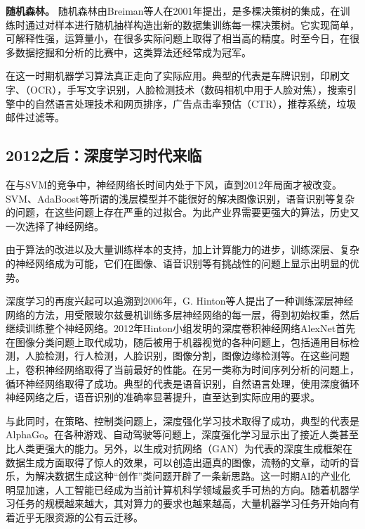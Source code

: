 \textbf{随机森林。}
随机森林由Breiman等人在2001年提出，是多棵决策树的集成，在训练时通过对样本进行随机抽样构造出新的数据集训练每一棵决策树。它实现简单，可解释性强，运算量小，在很多实际问题上取得了相当高的精度。时至今日，在很多数据挖掘和分析的比赛中，这类算法还经常成为冠军。

在这一时期机器学习算法真正走向了实际应用。典型的代表是车牌识别，印刷文字、（OCR），手写文字识别，人脸检测技术（数码相机中用于人脸对焦），搜索引擎中的自然语言处理技术和网页排序，广告点击率预估（CTR），推荐系统，垃圾邮件过滤等。

\subsection{2012之后：深度学习时代来临}
在与SVM的竞争中，神经网络长时间内处于下风，直到2012年\parencite{krizhevsky2017imagenet}局面才被改变。SVM、AdaBoost等所谓的浅层模型并不能很好的解决图像识别，语音识别等复杂的问题，在这些问题上存在严重的过拟合。为此产业界需要更强大的算法，历史又一次选择了神经网络。

由于算法的改进以及大量训练样本的支持，加上计算能力的进步，训练深层、复杂的神经网络成为可能，它们在图像、语音识别等有挑战性的问题上显示出明显的优势。

深度学习的再度兴起可以追溯到2006年，G. Hinton等人\parencite{hinton2006reducing}提出了一种训练深层神经网络的方法，用受限玻尔兹曼机训练多层神经网络的每一层，得到初始权重，然后继续训练整个神经网络。2012年Hinton小组发明的深度卷积神经网络AlexNet\parencite{krizhevsky2017imagenet}首先在图像分类问题上取代成功，随后被用于机器视觉的各种问题上，包括通用目标检测，人脸检测，行人检测，人脸识别，图像分割，图像边缘检测等。在这些问题上，卷积神经网络取得了当前最好的性能。在另一类称为时间序列分析的问题上，循环神经网络取得了成功。典型的代表是语音识别，自然语言处理，使用深度循环神经网络之后，语音识别的准确率显著提升，直至达到实际应用的要求。

与此同时，在策略、控制类问题上，深度强化学习技术取得了成功，典型的代表是AlphaGo\parencite{silver2016mastering}。在各种游戏、自动驾驶等问题上，深度强化学习显示出了接近人类甚至比人类更强大的能力。另外，以生成对抗网络（GAN）\parencite{goodfellow2014generative}为代表的深度生成框架在数据生成方面取得了惊人的效果，可以创造出逼真的图像，流畅的文章，动听的音乐，为解决数据生成这种“创作”类问题开辟了一条新思路。这一时期AI的产业化明显加速，人工智能已经成为当前计算机科学领域最炙手可热的方向。随着机器学习任务的规模越来越大，其对算力的要求也越来越高，大量机器学习任务开始向有着近乎无限资源的公有云迁移。

